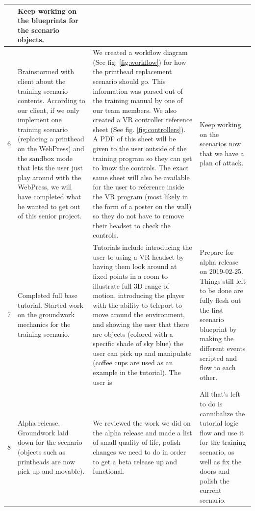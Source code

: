 \documentclass[onecolumn, draftclsnofoot,10pt, compsoc]{IEEEtran}
\begin{document}
\begin{longtable}{ |p{2cm}||p{5cm}|p{5cm}|p{5cm}|  }
    & Keep working on the blueprints for the scenario objects.
    \\
\hline
 6 & Brainstormed with client about the training scenario contents. According to our client, if we only implement one training scenario (replacing a printhead on the WebPress) and the sandbox mode that lets the user just play around with the WebPress, we will have completed what he wanted to get out of this senior project.
    & We created a workflow diagram (See fig. \ref{fig:workflow}) for how the printhead replacement scenario should go. This information was parsed out of the training manual by one of our team members. We also created a VR controller reference sheet (See fig. \ref{fig:controllers}). A PDF of this sheet will be given to the user outside of the training program so they can get to know the controls. The exact same sheet will also be available for the user to reference inside the VR program (most likely in the form of a poster on the wall) so they do not have to remove their headset to check the controls.
    & Keep working on the scenarios now that we have a plan of attack. \\
\hline
 7 & Completed full base tutorial. Started work on the groundwork mechanics for the training scenario.
     & Tutorials include introducing the user to using a VR headset by having them look around at fixed points in a room to illustrate full 3D range of motion, introducing the player with the ability to teleport to move around the environment, and showing the user that there are objects (colored with a specific shade of sky blue) the user can pick up and manipulate (coffee cups are used as an example in the tutorial). The user is
     & Prepare for alpha release on 2019-02-25. Things still left to be done are fully flesh out the first scenario blueprint by making the different events scripted and flow to each other.\\
\hline
 8 & Alpha release. Groundwork laid down for the scenario (objects such as printheads are now pick up and movable).
    & We reviewed the work we did on the alpha release and made a list of small quality of life, polish changes we need to do in order to get a beta release up and functional.
    & All that's left to do is cannibalize the tutorial logic flow and use it for the training scenario, as well as fix the doors and polish the current scenario.\\

\end{longtable}
\end{document}
